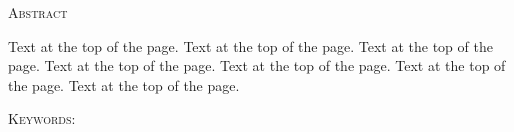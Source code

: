 \clearpage
\thispagestyle{empty}
\begin{center}
\textsc{\LARGE Abstract}\\[1.5cm]
\end{center}
Text at the top of the page. Text at the top of the page. 
Text at the top of the page. Text at the top of the page. 
Text at the top of the page. Text at the top of the page. 
Text at the top of the page.
 
\vspace{5mm} %

\blindtext

\vspace{5mm} %

\textsc{Keywords:}
